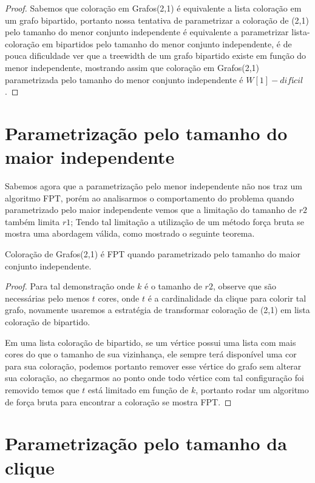\begin{proof}
	Sabemos que coloração em Grafos(2,1) é equivalente a lista coloração em um grafo bipartido, portanto nossa tentativa de parametrizar a coloração de (2,1) pelo tamanho do menor conjunto independente é equivalente a parametrizar lista-coloração em bipartidos pelo tamanho do menor conjunto independente, é de pouca dificuldade ver que a treewidth de um grafo bipartido existe em função do menor independente, mostrando assim que coloração em Grafos(2,1) parametrizada pelo tamanho do menor conjunto independente é $W[1]-difícil$. 
	
\end{proof}

\section{Parametrização pelo tamanho do maior independente}

 Sabemos agora que a parametrização pelo menor independente não nos traz um algoritmo FPT, porém ao analisarmos o comportamento do problema quando parametrizado pelo maior independente vemos que a limitação do tamanho de $r2$ também limita $r1$; Tendo tal limitação a utilização de um método força bruta se mostra uma abordagem válida, como mostrado o seguinte teorema.
\begin{teorema}
  Coloração de Grafos(2,1) é FPT quando parametrizado pelo tamanho do maior conjunto independente.
\end{teorema}
\begin{proof}
  Para tal demonstração onde $k$ é o tamanho de $r2$, observe que são necessárias pelo menos $t$ cores, onde $t$ é a cardinalidade da clique para colorir tal grafo, novamente usaremos a estratégia de transformar coloração de (2,1) em lista coloração de bipartido.
  
  Em uma lista coloração de bipartido, se um vértice possui uma lista com mais cores do que o tamanho de sua vizinhança, ele sempre terá disponível uma cor para sua coloração, podemos portanto remover esse vértice do grafo sem alterar sua coloração, ao chegarmos ao ponto onde todo vértice com tal configuração foi removido temos que $t$ está limitado em função de $k$, portanto rodar um algoritmo de força bruta para encontrar a coloração se mostra FPT.     
\end{proof}

\section{Parametrização pelo tamanho da clique}

